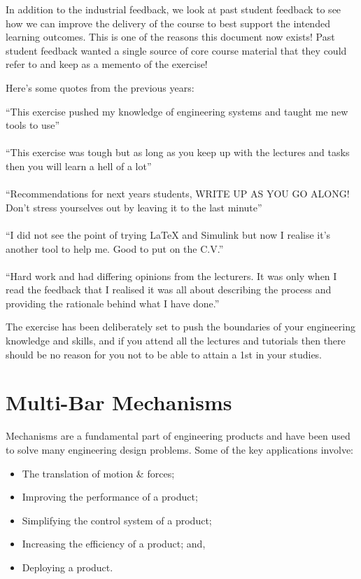 In addition to the industrial feedback, we look at past student feedback to see how we can improve the delivery of the course to best support the intended learning outcomes. This is one of the reasons this document now exists! Past student feedback wanted a single source of core course material that they could refer to and keep as a memento of the exercise!

Here's some quotes from the previous years:

\begin{center}
``This exercise pushed my knowledge of engineering systems and taught me new tools to use'' \\~\\
``This exercise was tough but as long as you keep up with the lectures and tasks then you will learn a hell of a lot''\\~\\
``Recommendations for next years students, WRITE UP AS YOU GO ALONG! Don't stress yourselves out by leaving it to the last minute''\\~\\
``I did not see the point of trying \LaTeX{} and Simulink but now I realise it’s another tool to help me. Good to put on the C.V.''\\~\\
``Hard work and had differing opinions from the lecturers. It was only when I read the feedback that I realised it was all about describing the process and providing the rationale behind what I have done.''
\end{center}

The exercise has been deliberately set to push the boundaries of your engineering knowledge and skills, and if you attend all the lectures and tutorials then there should be no reason for you not to be able to attain a 1st in your studies.

\section{Multi-Bar Mechanisms}

Mechanisms are a fundamental part of engineering products and have been used to solve many engineering design problems. Some of the key applications involve: 

\begin{itemize}
  \item The translation of motion \& forces;
  \item Improving the performance of a product;
  \item Simplifying the control system of a product;
  \item Increasing the efficiency of a product; and,
  \item Deploying a product.
\end{itemize}

